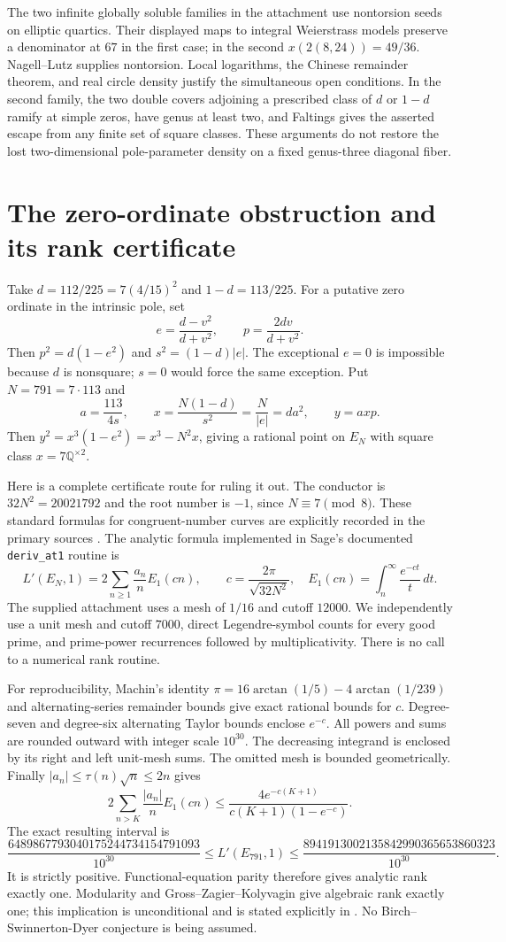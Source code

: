 \documentclass[11pt,a4paper]{article}
\newcommand{\Q}{\mathbb Q}\newcommand{\Z}{\mathbb Z}
\begin{document}
The two infinite globally soluble families in the attachment use
nontorsion seeds on elliptic quartics. Their displayed maps to integral
Weierstrass models preserve a denominator at $67$ in the first case;
in the second $x(2(8,24))=49/36$. Nagell--Lutz supplies nontorsion.
Local logarithms, the Chinese remainder theorem, and real circle density
justify the simultaneous open conditions. In the second family, the two
double covers adjoining a prescribed class of $d$ or $1-d$ ramify at
simple zeros, have genus at least two, and Faltings gives the asserted
escape from any finite set of square classes. These arguments do not
restore the lost two-dimensional pole-parameter density on a fixed
genus-three diagonal fiber.

\section{The zero-ordinate obstruction and its rank certificate}
Take $d=112/225=7(4/15)^2$ and $1-d=113/225$. For a putative zero
ordinate in the intrinsic pole, set
\[
 e=\frac{d-v^2}{d+v^2},\qquad p=\frac{2dv}{d+v^2}.
\]
Then $p^2=d(1-e^2)$ and $s^2=(1-d)|e|$. The exceptional $e=0$ is
impossible because $d$ is nonsquare; $s=0$ would force the same
exception. Put $N=791=7\cdot113$ and
\[
 a=\frac{113}{4s},\qquad
 x=\frac{N(1-d)}{s^2}=\frac{N}{|e|}=da^2,\qquad y=axp.
\]
Then $y^2=x^3(1-e^2)=x^3-N^2x$, giving a rational
point on $E_N$ with square class $x=7\Q^{\times2}$.

Here is a complete certificate route for ruling it out. The conductor is
$32N^2=20021792$ and the root number is $-1$, since $N\equiv7\pmod8$.
These standard formulas for congruent-number curves are explicitly
recorded in the primary sources \cite{Stein,Elkies}. The analytic formula
implemented in Sage's documented \texttt{deriv\_at1} routine \cite{Sage} is
\[
 L'(E_N,1)=2\sum_{n\ge1}\frac{a_n}{n}E_1(cn),\qquad
 c=\frac{2\pi}{\sqrt{32N^2}},\quad
 E_1(cn)=\int_n^\infty\frac{e^{-ct}}{t}\,dt.
\]
The supplied attachment uses a mesh of $1/16$ and cutoff $12000$.
We independently use a unit mesh and cutoff $7000$, direct
Legendre-symbol counts for every good prime, and prime-power recurrences
followed by multiplicativity. There is no call to a numerical rank routine.

For reproducibility, Machin's identity
$\pi=16\arctan(1/5)-4\arctan(1/239)$ and alternating-series remainder
bounds give exact rational bounds for $c$. Degree-seven and degree-six
alternating Taylor bounds enclose $e^{-c}$. All powers and sums are
rounded outward with integer scale $10^{30}$. The decreasing integrand
is enclosed by its right and left unit-mesh sums. The omitted mesh is
bounded geometrically. Finally $|a_n|\le\tau(n)\sqrt n\le2n$ gives
\[
 2\sum_{n>K}\frac{|a_n|}{n}E_1(cn)
 \le\frac{4e^{-c(K+1)}}{c(K+1)(1-e^{-c})}.
\]
The exact resulting interval is
\[
 \frac{6489867793040175244734154791093}{10^{30}}
 \le L'(E_{791},1)\le
 \frac{8941913002135842990365653860323}{10^{30}}.
\]
It is strictly positive. Functional-equation parity therefore gives
analytic rank exactly one. Modularity and Gross--Zagier--Kolyvagin give
algebraic rank exactly one; this implication is unconditional and is
stated explicitly in \cite{Venerucci}. No Birch--Swinnerton-Dyer conjecture
is being assumed.
\end{document}
